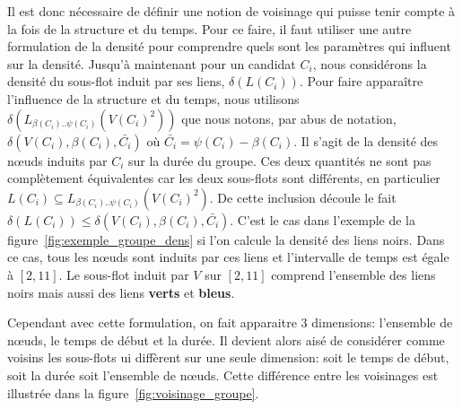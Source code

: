 Il est donc nécessaire de définir une notion de voisinage qui puisse tenir compte à la fois de la structure et du temps.
Pour ce faire, il faut utiliser une autre formulation de la densité pour comprendre quels sont les paramètres qui influent sur la densité.
Jusqu'à maintenant pour un candidat $C_i$, nous considérons la densité du sous-flot induit par ses liens, $\delta(L(C_i))$.
Pour faire apparaître l'influence de la structure et du temps, nous utilisons $\delta(L_{\beta(C_i)..\psi(C_i)}(V(C_i)^2))$ que nous notons, par abus de notation, $\delta(V(C_i),\beta(C_i), \bar{C_i})$ où $\bar{C_i} = \psi(C_i)-\beta(C_i)$.
Il s'agit de la densité des n\oe uds induits par $C_i$ sur la durée du groupe.
Ces deux quantités ne sont pas complètement équivalentes car les deux sous-flots sont différents, en particulier $L(C_i) \subseteq L_{\beta(C_i)..\psi(C_i)}(V(C_i)^2)$.
De cette inclusion découle le fait $\delta(L(C_i)) \leq \delta(V(C_i),\beta(C_i), \bar{C_i})$.
C'est le cas dans l'exemple de la figure~\ref{fig:exemple_groupe_dens} si l'on calcule la densité des liens noirs.
Dans ce cas,  tous les n\oe uds sont induits par ces liens et l'intervalle de temps est égale à $[2,11]$.
Le sous-flot induit par $V$ sur $[2,11]$ comprend l'ensemble des liens noirs mais aussi des liens \textcolor{vert_turquoise}{\textbf{verts}} et \textcolor{bleu_window}{\textbf{bleus}}.


Cependant avec cette formulation, on fait apparaitre 3 dimensions: l'ensemble de n\oe uds, le temps de début et la durée.
Il devient alors aisé de considérer comme voisins les sous-flots ui diffèrent sur une seule dimension: soit le temps de début, soit la durée soit l'ensemble de n\oe uds.
Cette différence entre les voisinages est illustrée dans la figure~\ref{fig:voisinage_groupe}.

